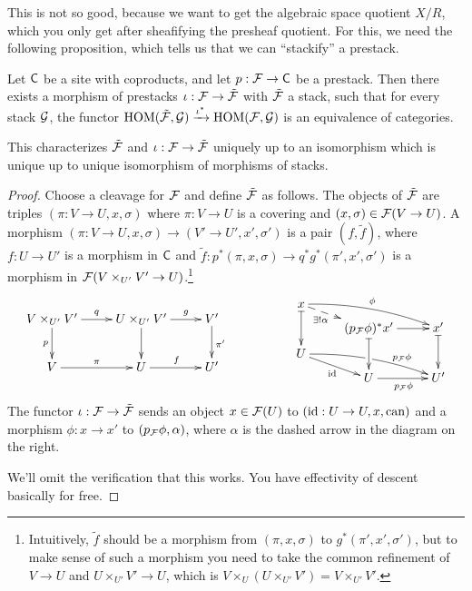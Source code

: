  This is not so good, because we want to get the algebraic space quotient $X/R$, which
 you only get after sheafifying the presheaf quotient. For this, we need the following
 proposition, which tells us that we can ``stackify'' a prestack.
 \begin{proposition}[Stackification]\label{lec25P:stackification}
   Let $\text{\sf C}$ be a site with coproducts, and let $p:\mathcal{F}\to \text{\sf C}$ be a prestack. Then there
   exists a morphism of prestacks $\iota:\mathcal{F}\to\tilde {\mathcal{F}}$ with $\tilde {\mathcal{F}}$ a stack, such
   that for every stack $\mathcal{G}$, the functor $\operatorname{HOM}(\tilde {\mathcal{F}},\mathcal{G})\xrightarrow{\iota^*}
   \operatorname{HOM}(\mathcal{F},\mathcal{G})$ is an equivalence of categories.
 \end{proposition}
 \begin{remark}
   This characterizes $\tilde {\mathcal{F}}$ and $\iota:\mathcal{F}\to \tilde {\mathcal{F}}$ uniquely up to an
   isomorphism which is unique up to unique isomorphism of morphisms of stacks.
 \end{remark}
 \begin{proof}
   Choose a cleavage for $\mathcal{F}$ and define $\tilde {\mathcal{F}}$ as follows. The objects of $\tilde
   {\mathcal{F}}$ are triples $(\pi:V\to U,x,\sigma)$ where $\pi:V\to U$ is a covering and
   $(x,\sigma)\in \mathcal{F}(V\to U)$. A morphism $(\pi:V\to U,x,\sigma)\to (V'\to
   U',x',\sigma')$ is a pair $(f,\tilde f)$, where $f:U\to U'$ is a morphism in $\text{\sf C}$ and
   $\tilde f:p^*(\pi,x,\sigma)\to q^*g^*(\pi',x',\sigma')$ is a morphism in
   $\mathcal{F}(V\times_{U'}V'\to U)$.\footnote{Intuitively, $\tilde f$ should be a morphism from
   $(\pi,x,\sigma)$ to $g^*(\pi',x',\sigma')$, but to make sense of such a morphism you
   need to take the common refinement of $V\to U$ and $U\times_{U'}V'\to U$, which is
   $V\times_U (U\times_{U'}V')=V\times_{U'}V'$.}
   \[\raisebox{-1pc}{$\xymatrix{
    V\times_{U'}V' \ar[r]^q\ar[d]_p & U\times_{U'} V'\ar[r]^<>(.5)g \ar[d]
    & V'\ar[d]^{\pi'}\\
    V\ar[r]^\pi & U\ar[r]^f & U'
   }$}\qquad\qquad\quad
   \xymatrix@R-1.5pc{
    x \ar@{|->}[dd]\ar@{-->}[dr]_<>(.5){\exists!\alpha} \ar@/^/[rrd]^{\phi}\\
     & (p_\F\phi)^* x'\ar@{|->}[dd] \ar[r] & x' \ar@{|->}[dd]\\
    U \ar[dr]_\id \ar@/^/[rrd]^(.7){p_\F\phi}|!{[ru];[rd]}\hole \\
    & U \ar[r]_{p_\F\phi} & U'
   }\]
    The functor $\iota:\mathcal{F}\to \tilde {\mathcal{F}}$ sends an object $x\in\mathcal{F}(U)$ to $(\operatorname{id}:U\to
   U,x,\text{can})$ and a morphism $\phi:x\to x'$ to $(p_{\mathcal{F}}\phi,\alpha)$, where
   $\alpha$ is the dashed arrow in the diagram on the right.

   We'll omit the verification that this works. You have effectivity of descent basically
   for free.
 \end{proof}
